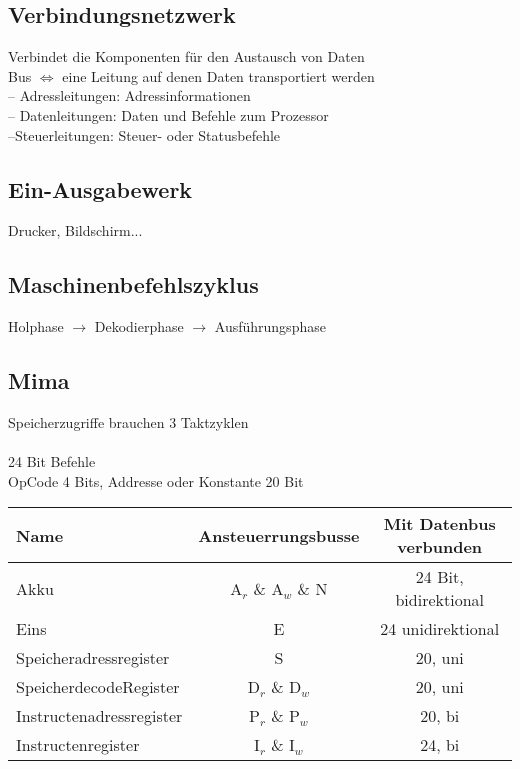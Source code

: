 \documentclass[a4paper]{scrartcl}
\begin{document}
		\subsection{Verbindungsnetzwerk}
		Verbindet die Komponenten für den Austausch von Daten\\
		Bus \( \iff  \) eine Leitung auf denen Daten transportiert werden\\
		-- Adressleitungen: Adressinformationen \\
		-- Datenleitungen: Daten und Befehle zum Prozessor \\
		--Steuerleitungen: Steuer- oder Statusbefehle \\
		
		\subsection{Ein-Ausgabewerk}
		Drucker, Bildschirm...\\
		
		\subsection{Maschinenbefehlszyklus}
		Holphase \( \rightarrow \) Dekodierphase  \( \rightarrow \) Ausführungsphase\\
		
		\subsection{Mima}
		Speicherzugriffe brauchen 3 Taktzyklen\\
		\\
		24 Bit Befehle\\
		OpCode 4 Bits, Addresse oder Konstante 20 Bit\\
		\begin{table}[H]
			\begin{tabular}{|l|c|c|}
				\hline
				Name & Ansteuerrungsbusse & Mit Datenbus verbunden \\
				\hline
				Akku  & A\( _r \) \& A\(_w\) \& N & 24 Bit, bidirektional\\
				Eins  & E & 24 unidirektional\\
				Speicheradressregister  & S & 20, uni\\
				SpeicherdecodeRegister & D\( _r \) \& D\(_w\) & 20, uni\\
				Instructenadressregister & P\( _r \) \& P\(_w\) & 20, bi\\
				Instructenregister & I\( _r \) \& I\(_w\) & 24, bi \\
				\hline
			\end{tabular}
		\end{table}
		
\end{document}
